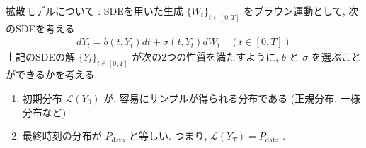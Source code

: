 \documentclass[11pt]{beamer}
\newcommand{\Pdata}{P_{\text{data}}}
\begin{document}
\begin{frame}{拡散モデルについて : SDEを用いた生成}
    $\{W_t\}_{t\in[0,T]}$ をブラウン運動として, 次のSDEを考える.
    \begin{align*}
        dY_t=b(t,Y_t)dt+\sigma(t,Y_t)dW_t\quad (t\in[0,T])
    \end{align*}
    上記のSDEの解 $\{Y_t\}_{t\in[0,T]}$ が次の2つの性質を満たすように, $b$ と $\sigma$ を選ぶことができるかを考える.
    \begin{block}{}
      \begin{enumerate}
        \item 初期分布 $\mathcal{L}(Y_0)$ が, 容易にサンプルが得られる分布である (正規分布, 一様分布など)
        \item 最終時刻の分布が $\Pdata$ と等しい. つまり, $\mathcal{L}(Y_T)=\Pdata$ .
      \end{enumerate}
    \end{block}

    \vspace{0.15cm}
    \begin{center}
    \end{center}
\end{frame}
\end{document}
